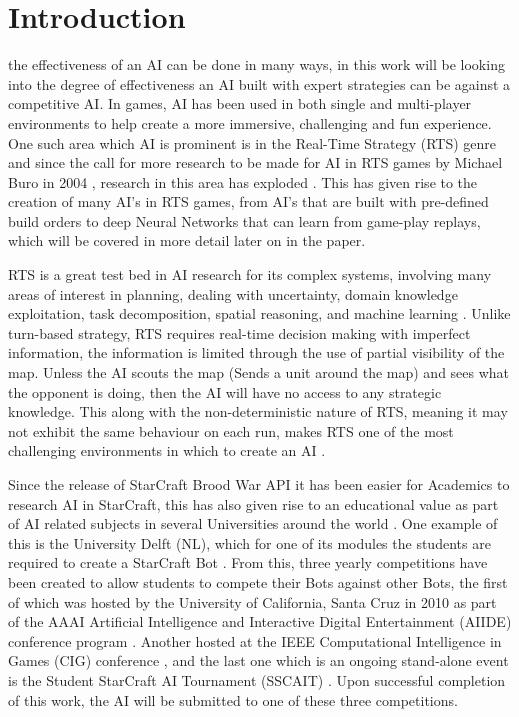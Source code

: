 \documentclass[journal]{IEEEtran}
\begin{document}
	\section{Introduction}
	 the effectiveness of an AI can be done in many ways, in this work will be looking into the degree of effectiveness an AI built with expert strategies can be against a competitive AI. %
	In games, AI has been used in both single and multi-player environments to help create a more immersive, challenging and fun experience. One such area which AI is prominent is in the Real-Time Strategy (RTS) genre and since the call for more research to be made for AI in RTS games by Michael Buro in 2004 \cite{CallFor}, research in this area has exploded \cite{Survey}. This has given rise to the creation of many AI's in RTS games, from AI's that are built with pre-defined build orders \cite{Swen} to deep Neural Networks \cite{Deep} that can learn from game-play replays, which will be covered in more detail later on in the paper.
	
	RTS is a great test bed in AI research for its complex systems, involving many areas of interest in planning, dealing with uncertainty, domain knowledge exploitation, task decomposition, spatial reasoning, and machine learning \cite{StarCraftBot}. Unlike turn-based strategy, RTS requires real-time decision making with imperfect information, the information is limited through the use of partial visibility of the map. Unless the AI scouts the map (Sends a unit around the map) and sees what the opponent is doing, then the AI will have no access to any strategic knowledge. This along with the non-deterministic nature of RTS, meaning it may not exhibit the same behaviour on each run, makes RTS one of the most challenging environments in which to create an AI \cite{Current}.
	
	Since the release of StarCraft Brood War API it has been easier for Academics to research AI in StarCraft, this has also given rise to an educational value as part of AI related subjects in several Universities around the world \cite{Current}. One example of this is the University Delft (NL), which for one of its modules the students are required to create a StarCraft Bot \cite{NL}. From this, three yearly competitions have been created to allow students to compete their Bots against other Bots, the first of which was hosted by the University of California, Santa Cruz in 2010 as part of the AAAI Artificial Intelligence and Interactive Digital Entertainment (AIIDE) conference program \cite{AIIDE}. Another hosted at the IEEE Computational Intelligence in Games (CIG) conference \cite{CIG}, and the last one which is an ongoing stand-alone event is the Student StarCraft AI Tournament (SSCAIT) \cite{StarCraftBot}. Upon successful completion of this work, the AI will be submitted to one of these three competitions.
	
\end{document}
